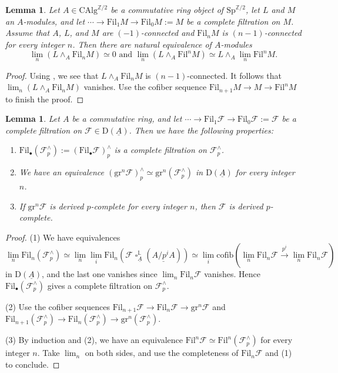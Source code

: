 \documentclass[10pt]{amsart}
\newtheorem{lem}[thm]{Lemma}
\theoremstyle{definition}
\numberwithin{equation}{section}
\renewcommand{\L}{\mathbb{L}}
\newcommand{\Z}{\mathbb{Z}}
\newcommand{\cF}{\mathcal{F}}
\newcommand{\rD}{\mathrm{D}}
\newcommand{\ul}{\underline}
\newcommand{\CAlg}{\mathrm{CAlg}}
\newcommand{\Sp}{\mathrm{Sp}}
\newcommand{\cofib}{\mathrm{cofib}}
\newcommand{\gr}{\mathrm{gr}}
\newcommand{\Fil}{\mathrm{Fil}}
\DeclareMathOperator{\sotimes}{\square}
\begin{document}
\begin{lem}
\label{limit and smash}
Let $A \in \CAlg^{\Z/2}$ be a commutative ring object of $\Sp^{\Z/2}$,
let $L$ and $M$ an $A$-modules,
and let $\cdots \to \Fil_1 M\to \Fil_0 M:=M$ be a complete filtration on $M$.
Assume that $A$, $L$, and $M$ are $(-1)$-connected and $\Fil_n M$ is $(n-1)$-connected for every integer $n$.
Then there are natural equivalence of $A$-modules
\[
\lim_n (L\wedge_A \Fil_n M)
\simeq
0
\text{ and }
\lim_n (L\wedge_A \Fil^n M)
\simeq
L\wedge_A \lim_n \Fil^n M.
\]
\end{lem}
\begin{proof}
Using \cite[Corollary 6.8.1]{BGS20},
we see that $L\wedge_A \Fil_n M$ is $(n-1)$-connected.
It follows that $\lim_n (L\wedge_A \Fil_n M)$ vanishes.
Use the cofiber sequence $\Fil_{n+1}M\to M\to \Fil^n M$ to finish the proof.
\end{proof}

\begin{lem}
\label{p-complete and filtration}
Let $A$ be a commutative ring,
and let $\cdots \to \Fil_1\cF\to \Fil_0\cF:=\cF$ be a complete filtration on $\cF\in \rD(\ul{A})$.
Then we have the following properties:
\begin{enumerate}
\item[\textup{(1)}]
$\Fil_\bullet (\cF_p^\wedge) :=(\Fil_\bullet \cF)_p^\wedge$ is a complete filtration on $\cF_p^\wedge$.
\item[\textup{(2)}]
We have an equivalence
\(
(\gr^n \cF)_p^\wedge
\simeq
\gr^n (\cF_p^\wedge)
\)
in $\rD(\ul{A})$ for every integer $n$.
\item[\textup{(3)}]
If $\gr^n\cF$ is derived $p$-complete for every integer $n$,
then $\cF$ is derived $p$-complete. 
\end{enumerate}
\end{lem}
\begin{proof}
(1) We have equivalences
\[
\lim_n \Fil_n (\cF_p^\wedge)
\simeq
\lim_n \lim_i \Fil_n (\cF \sotimes_{\ul{A}}^\L (\ul{A/p^i A}))
\simeq
\lim_i \cofib( \lim_n \Fil_n \cF \xrightarrow{p^i}   \lim_n \Fil_n \cF  )
\]
in $\rD(\ul{A})$,
and the last one vanishes since $\lim_{n} \Fil_n \cF$ vanishes.
Hence $\Fil_\bullet (\cF_p^\wedge)$ gives a complete filtration on $\cF_p^\wedge$.

(2) Use the cofiber sequences $\Fil_{n+1}\cF\to \Fil_n\cF\to \gr^n \cF$ and $\Fil_{n+1} (\cF_p^\wedge) \to \Fil_n (\cF_p^\wedge)\to \gr^n (\cF_p^\wedge)$.

(3) By induction and (2),
we have an equivalence $\Fil^n \cF \simeq \Fil^n(\cF_p^\wedge)$ for every integer $n$.
Take $\lim_n$ on both sides, and use the completeness of $\Fil_n\cF$ and (1) to conclude.
\end{proof}
\end{document}
